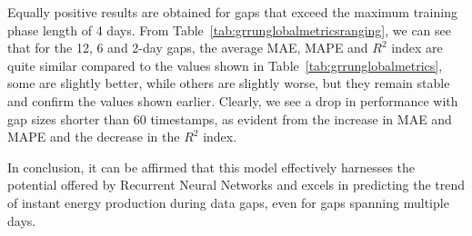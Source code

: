 
Equally positive results are obtained for gaps that exceed the
maximum training phase length of 4 days.
From Table~\ref{tab:grrunglobalmetricsranging}, we can see that for the
12, 6 and 2-day gaps, the average MAE, MAPE and $R^2$ index are quite similar compared to the values shown in Table~\ref{tab:grrunglobalmetrics},
some are slightly better, while others are slightly worse, but they remain stable and confirm the values shown earlier.
Clearly, we see a drop in performance with gap sizes shorter than 60 timestamps, as evident from the increase in MAE and MAPE and the decrease in the $R^2$ index.


In conclusion, it can be affirmed that this model effectively
harnesses the potential offered by Recurrent Neural Networks and
excels in predicting the trend of instant energy production
during data gaps, even for gaps spanning multiple days.


